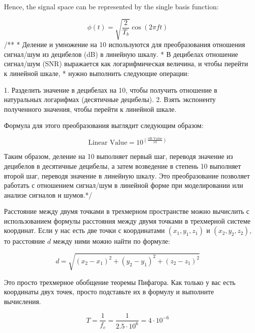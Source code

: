 \documentclass[14pt, a4paper]{extarticle}
\begin{document}
Hence, the signal space can be represented by the single basis function:

\[
\phi(t) = \sqrt{\frac{2}{T_{b}}} \cos\left(2\pi ft\right)
\]
\newpage
/**
 * Деление и умножение на 10 используются для преобразования отношения сигнал/шум из децибелов (dB) в линейную шкалу.
 * В децибелах отношение сигнал/шум (SNR) выражается как логарифмическая величина, и чтобы перейти к линейной шкале,
 * нужно выполнить следующие операции:

1. Разделить значение в децибелах на 10, чтобы получить отношение в натуральных логарифмах (десятичные децибелы).
2. Взять экспоненту полученного значения, чтобы перейти к линейной шкале.

Формула для этого преобразования выглядит следующим образом:

\[ \text{Linear Value} = 10^{\left(\frac{\text{dB Value}}{10}\right)} \]

Таким образом, деление на 10 выполняет первый шаг, переводя значение из децибелов в десятичные децибелы,
 а затем возведение в степень 10 выполняет второй шаг, переводя значение в линейную шкалу.
 Это преобразование позволяет работать с отношением сигнал/шум в линейной форме при моделировании или анализе сигналов и шумов.*/

\newpage

Расстояние между двумя точками в трехмерном пространстве можно вычислить с использованием формулы расстояния между двумя точками в трехмерной системе координат. Если у нас есть две точки с координатами \((x_1, y_1, z_1)\) и \((x_2, y_2, z_2)\), то расстояние \(d\) между ними можно найти по формуле:

\[ d = \sqrt{(x_2 - x_1)^2 + (y_2 - y_1)^2 + (z_2 - z_1)^2} \]

Это просто трехмерное обобщение теоремы Пифагора. Как только у вас есть координаты двух точек, просто подставьте их в формулу и выполните вычисления.
  
$$T = \frac{1}{f_c} = \frac{1}{2.5 \cdot 10^6} = 4 \cdot 10^{-6} $$
\end{document}
